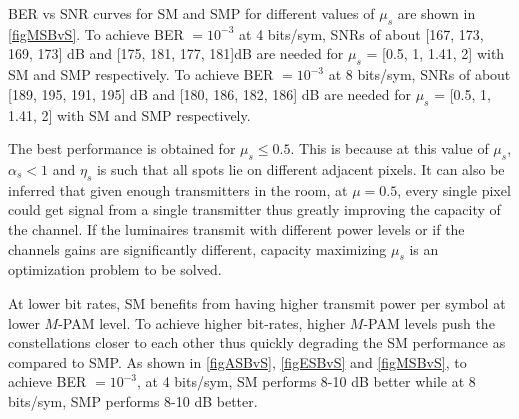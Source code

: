 BER vs SNR curves for SM and SMP for different values of $\mu_{s}$ are shown in \figurename{ \ref{figMSBvS}}. To achieve BER $=10^{-3}$ at 4 bits/sym, SNRs of about [167, 173, 169, 173] dB and [175, 181, 177, 181]dB are needed for $\mu_{s}$ = [0.5, 1, 1.41, 2] with SM and SMP respectively. To achieve BER $=10^{-3}$ at 8 bits/sym, SNRs of about [189, 195, 191, 195] dB and [180, 186, 182, 186] dB are needed for $\mu_{s}$ = [0.5, 1, 1.41, 2] with SM and SMP respectively.

The best performance is obtained for $\mu_{s}\leq 0.5$. This is because at this value of $\mu_{s}$, $\alpha_{s}<1$ and $\eta_{s}$ is such that all spots lie on different adjacent pixels. It can also be inferred that given enough transmitters in the room, at $\mu=0.5$, every single pixel could get signal from a single transmitter thus greatly improving the capacity of the channel. If the luminaires transmit with different power levels or if the channels gains are significantly different, capacity maximizing $\mu_{s}$ is an optimization problem to be solved.

At lower bit rates, SM benefits from having higher transmit power per symbol at lower $M$-PAM level. To achieve higher bit-rates, higher $M$-PAM levels push the constellations closer to each other thus quickly degrading the SM performance as compared to SMP. As shown in \figurename{ \ref{figASBvS}}, \figurename{ \ref{figESBvS}} and \figurename{ \ref{figMSBvS}}, to achieve BER $=10^{-3}$, at 4 bits/sym, SM performs 8-10 dB better while at 8 bits/sym, SMP performs 8-10 dB better.


